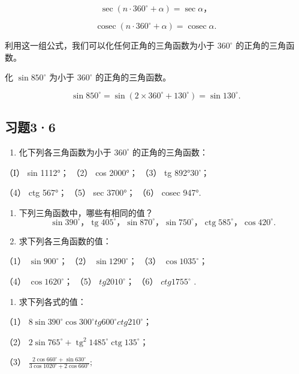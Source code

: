 \[
\sec (n \cdot 360 ^{\circ} + \alpha) = \sec \alpha \text{，}
\]

\[
\operatorname{cosec} (n \cdot 360 ^{\circ} + \alpha) = \operatorname{cosec} \alpha .
\]

利用这一组公式，我们可以化任何正角的三角函数为小于 \(360^{\circ}\)
的正角的三角函数。

化 \(\sin 850^{\circ}\) 为小于 \(360^{\circ}\) 的正角的三角函数。

\[
\sin 850 ^{\circ} = \sin (2 \times 360 ^{\circ} + 130 ^{\circ}) = \sin 130 ^{\circ}.
\]

\subsection{习题3·6}

\begin{enumerate}
\item
  化下列各三角函数为小于 \(360^{\circ}\) 的正角的三角函数：
\end{enumerate}

（I） sin 1112°； （2） cos 2000°； （3） tg 892°30'；

（4） ctg 567°； （5） sec 3700°； （6） cosec 947°.

\begin{enumerate}[start=2]
\item
  下列三角函数中，哪些有相同的值？
\[
\sin 390 ^{\circ}\text{，} \operatorname{tg} 405 ^{\circ}\text{，} \sin 870 ^{\circ}\text{，} \sin 750 ^{\circ}\text{，} \operatorname{ctg} 585 ^{\circ}\text{，} \cos 420 ^{\circ}.
\]
\item
  求下列各三角函数的值：
\end{enumerate}

（1） \(\sin 900^{\circ}\)； （2） \(\sin 1290^{\circ}\)； （3）
\(\cos 1035^{\circ}\)；

（4） \(\cos1620^{\circ}\)； （5） \(tg2010^{\circ}\)； （6）
\(ctg1755^{\circ}\) .

\begin{enumerate}[start=4]
\item
  求下列各式的值：
\end{enumerate}

（1）
\(8 \sin 390^{\circ} \cos 300^{\circ} tg 600^{\circ} ctg 210^{\circ}\)；

（2）
\(2\sin 765^{\circ} + \operatorname{tg}^{2} 1485^{\circ} \operatorname{ctg} 135^{\circ}\)；

（3）
\(\frac{2\cos 660^{\circ} + \sin 630^{\circ}}{3\cos 1020^{\circ} + 2\cos 660^{\circ}};\)

